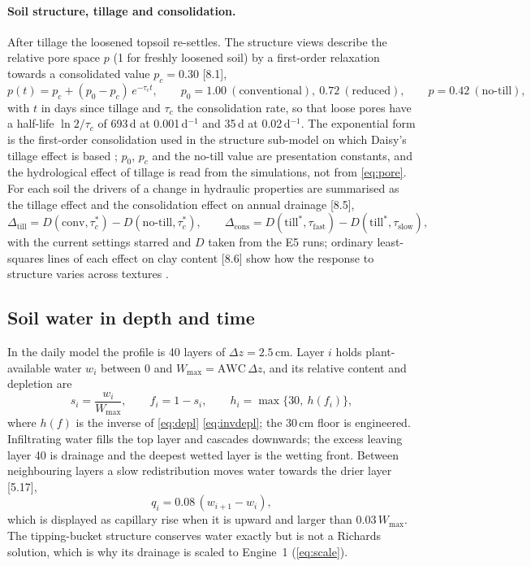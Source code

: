\paragraph{Soil structure, tillage and consolidation.}
\label{sec:sys-structure}
After tillage the loosened topsoil re-settles. The structure views describe the relative pore space $p$ (1 for freshly loosened soil) by a first-order relaxation towards a consolidated value $p_c=0.30$ [8.1],
\begin{equation}
p(t)=p_c+(p_0-p_c)\,e^{-\tau_ct},\qquad p_0=1.00\ (\text{conventional}),\ 0.72\ (\text{reduced}),\qquad p=0.42\ (\text{no-till}),
\label{eq:pore}
\end{equation}
with $t$ in days since tillage and $\tau_c$ the consolidation rate, so that loose pores have a half-life $\ln2/\tau_c$ of 693\,d at 0.001\,d$^{-1}$ and 35\,d at 0.02\,d$^{-1}$. The exponential form is the first-order consolidation used in the structure sub-model on which Daisy's tillage effect is based \citep{Flanagan1995}; $p_0$, $p_c$ and the no-till value are presentation constants, and the hydrological effect of tillage is read from the simulations, not from \cref{eq:pore}. For each soil the drivers of a change in hydraulic properties are summarised as the tillage effect and the consolidation effect on annual drainage [8.5],
\begin{equation}
\Delta_{\mathrm{till}}=D(\mathrm{conv},\tau_c^\ast)-D(\mathrm{no\text{-}till},\tau_c^\ast),\qquad \Delta_{\mathrm{cons}}=D(\mathrm{till}^\ast,\tau_{\mathrm{fast}})-D(\mathrm{till}^\ast,\tau_{\mathrm{slow}}),
\label{eq:drivers}
\end{equation}
with the current settings starred and $D$ taken from the E5 runs; ordinary least-squares lines of each effect on clay content [8.6] show how the response to structure varies across textures \citep{Strudley2008,Leuther2021}.

\subsection{Soil water in depth and time}
\label{sec:sys-water}
In the daily model the profile is 40 layers of $\Delta z=2.5$\,cm. Layer $i$ holds plant-available water $w_i$ between 0 and $W_{\max}=\mathrm{AWC}\,\Delta z$, and its relative content and depletion are
\begin{equation}
s_i=\frac{w_i}{W_{\max}},\qquad f_i=1-s_i,\qquad h_i=\max\{30,\ h(f_i)\},
\label{eq:layer}
\end{equation}
where $h(f)$ is the inverse of \cref{eq:depl} \cref{eq:invdepl}; the 30\,cm floor is engineered. Infiltrating water fills the top layer and cascades downwards; the excess leaving layer 40 is drainage and the deepest wetted layer is the wetting front. Between neighbouring layers a slow redistribution moves water towards the drier layer [5.17],
\begin{equation}
q_i=0.08\,(w_{i+1}-w_i),
\label{eq:redis}
\end{equation}
which is displayed as capillary rise when it is upward and larger than $0.03\,W_{\max}$. The tipping-bucket structure conserves water exactly but is not a Richards solution, which is why its drainage is scaled to Engine~1 (\cref{eq:scale}).

